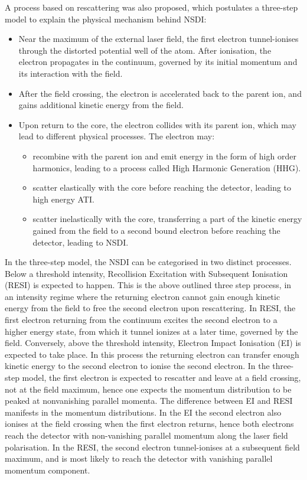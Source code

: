 \documentclass[11pt]{article}
\numberwithin{equation}{section}
\begin{document}
A process based on rescattering was also proposed\cite{corkum_1993_plasma}, which postulates a three-step model to explain the physical mechanism behind NSDI:
\begin{itemize}
    \item Near the maximum of the external laser field, the first electron tunnel-ionises through the distorted potential well of the atom. After ionisation, the electron propagates in the continuum, governed by its initial momentum and its interaction with the field.
    \item After the field crossing, the electron is accelerated back to the parent ion, and gains additional kinetic energy from the field.
    \item Upon return to the core, the electron collides with its parent ion, which may lead to different physical processes. The electron may:
    \begin{itemize}
        \item recombine with the parent ion and emit energy in the form of high order harmonics, leading to a process called High Harmonic Generation (HHG).
        \item scatter elastically with the core before reaching the detector, leading to high energy ATI.
        \item scatter inelastically with the core, transferring a part of the kinetic energy gained from the field to a second bound electron before reaching the detector, leading to NSDI.
    \end{itemize}
\end{itemize}
In the three-step model, the NSDI can be categorised in two distinct processes. Below a threshold intensity, Recollision Excitation with Subsequent Ionisation (RESI) is expected to happen. This is the above outlined three step process, in an intensity regime where the returning electron cannot gain enough kinetic energy from the field to free the second electron upon rescattering. In RESI, the first electron returning from the continuum excites the second electron to a higher energy state, from which it tunnel ionizes at a later time, governed by the field. 
Conversely, above the threshold intensity, Electron Impact Ionisation (EI) is expected to take place. In this process the returning electron can transfer enough kinetic energy to the second electron to ionise the second electron.
\newline
In the three-step model, the first electron is expected to rescatter and leave at a field crossing, not at the field maximum, hence one expects the momentum distribution to be peaked at nonvanishing parallel momenta. The difference between EI and RESI manifests in the momentum distributions. In the EI the second electron also ionises at the field crossing when the first electron returns, hence both electrons reach the detector with non-vanishing parallel momentum along the laser field polarisation. In the RESI, the second electron tunnel-ionises at a subsequent field maximum, and is most likely to reach the detector with vanishing parallel momentum component.
\end{document}
